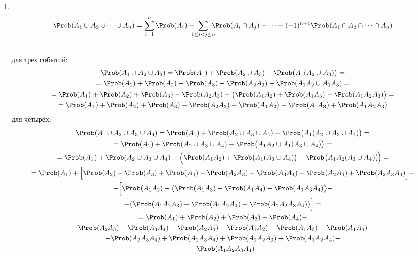 \begin{enumerate}
	\item {} \\
	\[
		\Prob(A_1 \cup A_2 \cup \dots \cup A_n) = \sum_{i = 1}^{n} \Prob(A_i) - \!\!\!\! \sum_{1 \leq i < j \leq n} \!\!\!\! \Prob(A_i \cap A_j) - \dots + (- 1)^{n + 1} \Prob(A_1 \cap A_2 \cap \dots \cap A_n)
	\]
	\begin{Proof}\hfill\\
		для трех событий:
		\begin{multline*}
			\Prob(A_1 \cup A_2 \cup A_3) = \Prob(A_1) + \Prob(A_2 \cup A_3) - \Prob\bigl(A_1(A_2 \cup A_3)\bigr) = \\ 
			= \Prob(A_1) + \Prob(A_2) + \Prob(A_3) - \Prob(A_2 A_3) - \Prob(A_1 A_2 \cup A_1 A_3) = \\
			= \Prob(A_1) + \Prob(A_2) + \Prob(A_3) - \Prob(A_2 A_3) - \bigl(\Prob(A_1 A_2) + \Prob(A_1 A_3) - \Prob(A_1 A_2 A_3) \bigr) = \\
			= \Prob(A_1) + \Prob(A_2) + \Prob(A_3) - \Prob(A_2 A_3) - \Prob(A_1 A_2) - \Prob(A_1 A_3) + \Prob(A_1 A_2 A_3)
		\end{multline*}
		для четырёх:
		\begin{multline*}
			\Prob(A_1 \cup A_2 \cup A_3 \cup A_4) = \Prob(A_1) + \Prob(A_2 \cup A_3 \cup A_4) - \Prob\bigl(A_1 (A_2 \cup A_3 \cup A_4)\bigr) = \\
			= \Prob(A_1) + \Prob(A_2 \cup A_3 \cup A_4) - \Prob\bigl(A_1 A_2 \cup A_1 (A_3 \cup A_4)\bigr) = \\
			= \Prob(A_1) + \Prob(A_2 \cup A_3 \cup A_4) - \Bigl(\Prob(A_1 A_2) + \Prob\bigl(A_1 (A_3 \cup A_4)\bigr) - \Prob\bigl(A_1 A_2 (A_3 \cup A_4)\bigr)\!\Bigr) = \\
			= \Prob(A_1) + \Bigl[\Prob(A_2) + \Prob(A_3) + \Prob(A_4) - \Prob(A_2 A_3) - \Prob(A_3 A_4) - \Prob(A_2 A_4) + \Prob(A_2 A_3 A_4)\Bigr] - \\
			- \Bigl[\Prob(A_1 A_2) + \bigl< \Prob(A_1 A_3) + \Prob(A_1 A_4) - \Prob(A_1 A_3 A_4) \bigr> - \\
			- \bigl< \Prob(A_1 A_2 A_3) + \Prob(A_1 A_2 A_4) - \Prob(A_1 A_2 A_3 A_4) \bigr>  \Bigr] = \\
			= \Prob(A_1) + \Prob(A_2) + \Prob(A_3) + \Prob(A_4) - \\
			- \Prob(A_2 A_3) - \Prob(A_3 A_4) - \Prob(A_2 A_4) - \Prob(A_1 A_2) - \Prob(A_1 A_3) - \Prob(A_1 A_4) + \\
			+ \Prob(A_2 A_3 A_4) + \Prob(A_1 A_3 A_4) + \Prob(A_1 A_2 A_3) + \Prob(A_1 A_2 A_4) - \\
			- \Prob(A_1 A_2 A_3 A_4)
		\end{multline*}
	\end{Proof}
\end{enumerate}



